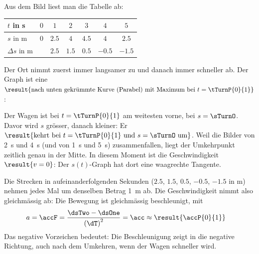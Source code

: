 \begin{abcliste}
\abc Aus dem Bild liest man die Tabelle ab:
\begin{center}
\begin{tabular}{l|cccccc}
$t$ in \si{\second} & $0$ & $1$ & $2$ & $3$ & $4$ & $5$ \\
\hline
$s$ in \si{\meter} & $0$ & $2.5$ & $4$ & $4.5$ & $4$ & $2.5$ \\
\hline
$\Delta s$ in \si{\meter} & & $2.5$ & $1.5$ & $0.5$ & $-0.5$ & $-1.5$
\end{tabular}
\end{center}
Der Ort nimmt zuerst immer langsamer zu und danach immer schneller ab. Der Graph ist eine $\result{\text{nach unten gekrümmte Kurve (Parabel) mit Maximum bei } t = \tTurnP{0}{1}}$:
\begin{center}
\end{center}
\abc Der Wagen ist bei $t = \tTurnP{0}{1}$ am weitesten vorne, bei $s = \sTurnO$. Davor wird $s$ grösser, danach kleiner: Er $\result{\text{kehrt bei } t = \tTurnP{0}{1} \text{ und } s = \sTurnO \text{ um}}$. Weil die Bilder von \SI{2}{\second} und \SI{4}{\second} (und von \SI{1}{\second} und \SI{5}{\second}) zusammenfallen, liegt der Umkehrpunkt zeitlich genau in der Mitte. In diesem Moment ist die Geschwindigkeit $\result{v = 0}$: Der $s(t)$-Graph hat dort eine waagrechte Tangente.

\abc Die Strecken in aufeinanderfolgenden Sekunden ($2.5$, $1.5$, $0.5$, $-0.5$, $-1.5$ in \si{\meter}) nehmen jedes Mal um denselben Betrag \SI{1}{\meter} ab. Die Geschwindigkeit nimmt also gleichmässig ab: Die Bewegung ist gleichmässig beschleunigt, mit
\begin{align}
 a &= \accF = \frac{\dsTwo-\dsOne}{\left(\dT\right)^2} = \acc \approx \result{\accP{0}{1}}
\end{align}
Das negative Vorzeichen bedeutet: Die Beschleunigung zeigt in die negative Richtung, auch nach dem Umkehren, wenn der Wagen schneller wird.
\end{abcliste}
